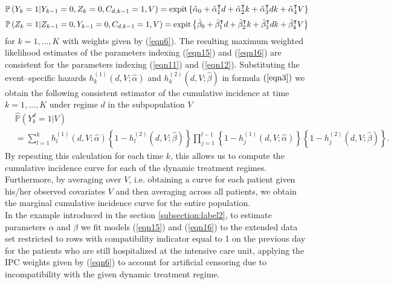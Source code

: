\documentclass[12pt]{article}
\begin{document}
\begin{equation}
\label{eqn15}
\mathbb{P} \left( Y_k = 1 \vert Y_{k-1} = 0, Z_k = 0, C_{d,k-1} = 1, V \right) = \text{expit} \left\lbrace \tilde{\alpha}_0 + \tilde{\alpha}_1^\intercal d + \tilde{\alpha}_2^\intercal k + \tilde{\alpha}_3^\intercal d k + \tilde{\alpha}_4^\intercal V \right\rbrace
\end{equation}
\begin{equation}
\label{eqn16}
\mathbb{P} \left( Z_k = 1 \vert Z_{k-1} = 0, Y_{k-1} = 0, C_{d,k-1} = 1, V \right) =  \text{expit} \left\lbrace \tilde{\beta}_0 + \tilde{\beta}_1^\intercal d + \tilde{\beta}_2^\intercal k  + \tilde{\beta}_3^\intercal d k + \tilde{\beta}_4^\intercal V \right\rbrace
\end{equation}
for $k = 1, \dots, K$ with weights given by (\ref{eqn6}). The resulting maximum weighted likelihood estimates of the parameters indexing (\ref{eqn15}) and (\ref{eqn16}) are consistent for the parameters indexing (\ref{eqn11}) and (\ref{eqn12}). Substituting the event--specific hazards $h_k^{(1)} \left(d, V; \hat{\alpha} \right)$ and $h_k^{(2)} \left(d, V; \hat{\beta} \right)$ in formula $(\ref{eqn3})$ we obtain the following consistent estimator of the cumulative incidence at time $k = 1, \dots, K$ under regime $d$ in the subpopulation $V$
\begin{align}
\label{eqn17}
&\hat{\mathbb{P}} \left( Y_k^d = 1 \vert V \right) \\
\nonumber
&= \sum_{l=1}^{k} h_l^{(1)} \left(d, V; \hat{\alpha} \right) \left\lbrace 1 - h_l^{(2)} \left(d, V; \hat{\beta} \right) \right\rbrace \prod_{j=1}^{l-1} \left\lbrace 1-h_j^{(1)} \left(d, V; \hat{\alpha} \right) \right\rbrace \left\lbrace 1-h_j^{(2)} \left(d, V; \hat{\beta} \right) \right\rbrace.
\end{align}
By repeating this calculation for each time $k$, this allows us to compute the cumulative incidence curve for each of the dynamic treatment regimes. Furthermore, by averaging over $V$, i.e. obtaining a curve for each patient given his/her observed covariates $V$ and then averaging across all patients, we obtain the marginal cumulative incidence curve for the entire population. 
\\
\indent
In the example introduced in the section \ref{subsection:label2}, to estimate parameters $\alpha$ and $\beta$ we fit models (\ref{eqn15}) and (\ref{eqn16}) to the extended data set restricted to rows with compatibility indicator equal to 1 on the previous day for the patients who are still hospitalized at the intensive care unit, applying the IPC weights given by (\ref{eqn6}) to account for artificial censoring due to incompatibility with the given dynamic treatment regime.
\end{document}
